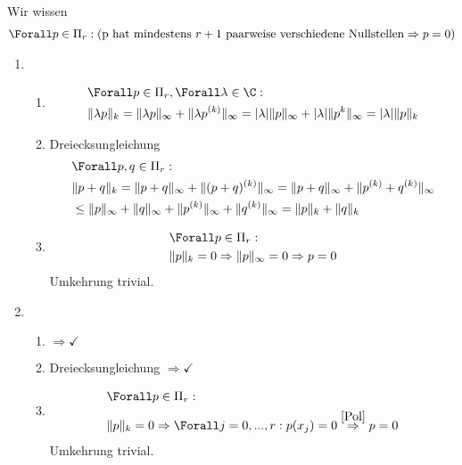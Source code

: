 \begin{solution}
Wir wissen
\begin{align}\label{Pol}
  \Forall p \in \Pi_r :(\text{p hat mindestens $r+1$ paarweise verschiedene Nullstellen} \Rightarrow p = 0)
\end{align}
\begin{enumerate}[label = \textbf{\alph*)}]
  \item
  \begin{enumerate}[label = \textit{\roman*)}]
    \item {} \begin{align*}
      & \Forall p \in \Pi_r, \Forall \lambda \in \C: \\
      & \|\lambda p\|_k = \|\lambda p\|_\infty + \|\lambda p^{(k)}\|_\infty = |\lambda| \|p\|_\infty + |\lambda| \|p^{k}\|_\infty = |\lambda| \|p\|_k
    \end{align*}
    \item Dreiecksungleichung \begin{align*}
      &\Forall p,q \in \Pi_r: \\
      & \|p+q\|_k = \|p+q\|_\infty + \|(p+q)^{(k)}\|_\infty = \|p+q\|_\infty + \|p^{(k)}+q^{(k)}\|_\infty\\
      &\leq \|p\|_\infty + \|q\|_\infty + \|p^{(k)}\|_\infty + \|q^{(k)}\|_\infty = \|p\|_k + \|q\|_k
    \end{align*}
    \item {} \begin{align*}
      &\Forall p \in \Pi_r: \\
      & \|p\|_k = 0 \Rightarrow \|p\|_\infty = 0 \Rightarrow p = 0
    \end{align*}
    Umkehrung trivial.
  \end{enumerate}
  \item
  \begin{enumerate}[label = \textit{\roman*)}]
    \item {} $\Rightarrow \checkmark$
    \item Dreiecksungleichung $\Rightarrow \checkmark$
    \item {} \begin{align*}
      &\Forall p \in \Pi_r: \\
      & \|p\|_k = 0 \Rightarrow \Forall j=0,...,r: p(x_j) = 0 \stackrel{\eqref{Pol}}{\Rightarrow} p = 0
    \end{align*}
    Umkehrung trivial.
  \end{enumerate}

\end{enumerate}
\end{solution}
